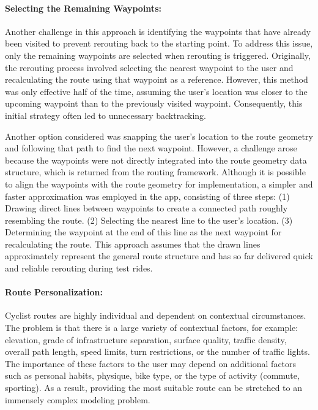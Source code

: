 \paragraph{Selecting the Remaining Waypoints:} Another challenge in this approach is identifying the waypoints that have already been visited to prevent rerouting back to the starting point. To address this issue, only the remaining waypoints are selected when rerouting is triggered. Originally, the rerouting process involved selecting the nearest waypoint to the user and recalculating the route using that waypoint as a reference. However, this method was only effective half of the time, assuming the user's location was closer to the upcoming waypoint than to the previously visited waypoint. Consequently, this initial strategy often led to unnecessary backtracking.

Another option considered was snapping the user's location to the route geometry and following that path to find the next waypoint. However, a challenge arose because the waypoints were not directly integrated into the route geometry data structure, which is returned from the routing framework. Although it is possible to align the waypoints with the route geometry for implementation, a simpler and faster approximation was employed in the app, consisting of three steps: (1) Drawing direct lines between waypoints to create a connected path roughly resembling the route. (2) Selecting the nearest line to the user's location. (3) Determining the waypoint at the end of this line as the next waypoint for recalculating the route. This approach assumes that the drawn lines approximately represent the general route structure and has so far delivered quick and reliable rerouting during test rides.

\paragraph{Route Personalization:} Cyclist routes are highly individual and dependent on contextual circumstances. The problem is that there is a large variety of contextual factors, for example: elevation, grade of infrastructure separation, surface quality, traffic density, overall path length, speed limits, turn restrictions, or the number of traffic lights. The importance of these factors to the user may depend on additional factors such as personal habits, physique, bike type, or the type of activity (commute, sporting). As a result, providing the most suitable route can be stretched to an immensely complex modeling problem.

